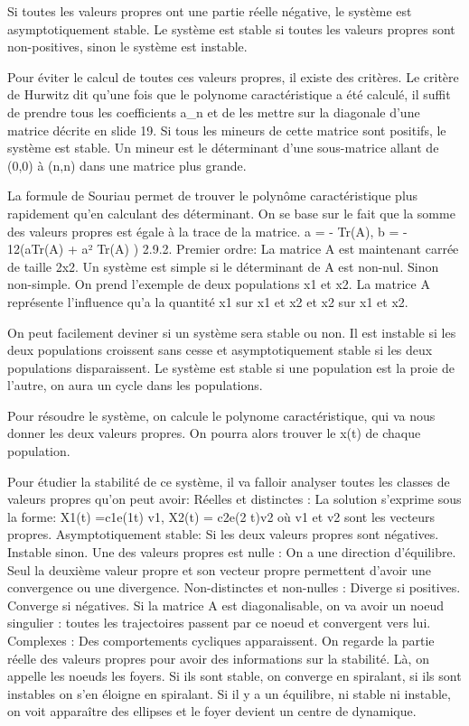 Si toutes les valeurs propres ont une partie réelle négative, le système est asymptotiquement stable.
Le système est stable si toutes les valeurs propres sont non-positives, sinon le système est instable.

Pour éviter le calcul de toutes ces valeurs propres, il existe des critères.
Le critère de Hurwitz dit qu'une fois que le polynome caractéristique a été calculé, il suffit de prendre tous les coefficients a_n et de les mettre sur la diagonale d'une matrice décrite en slide 19. Si tous les mineurs de cette matrice sont positifs, le système est stable.
Un mineur est le déterminant d’une sous-matrice allant de (0,0) à (n,n) dans une matrice plus grande.

La formule de Souriau permet de  trouver le polynôme caractéristique plus rapidement qu’en calculant des déterminant. On se base sur le fait que la somme des valeurs propres est égale à la trace de la matrice.
a = - Tr(A), b = - 12(aTr(A) + a²  Tr(A) )
2.9.2. Premier ordre:
La matrice A est maintenant carrée de taille 2x2. 
Un système est  simple si le déterminant de A est non-nul. Sinon non-simple.
 On prend l’exemple de deux populations x1 et x2. La matrice A représente l’influence qu’a la quantité x1 sur x1 et x2 et x2 sur x1 et x2.

On peut facilement deviner si un système sera stable ou non.
Il est instable si les deux populations croissent sans cesse et asymptotiquement stable si les deux populations disparaissent. Le système est stable si une population est la proie de l’autre, on aura un cycle dans les populations.

Pour résoudre le système, on calcule le polynome caractéristique, qui va nous donner les deux valeurs propres. On pourra alors trouver le x(t) de chaque population.

Pour étudier la stabilité de ce système, il va falloir analyser toutes les classes de valeurs propres qu’on peut avoir:
Réelles et distinctes : La solution s’exprime sous la forme: X1(t) =c1e(1t) v1, X2(t) = c2e(2 t)v2 où v1 et v2 sont les vecteurs propres.
Asymptotiquement stable: Si les deux valeurs propres sont négatives.
Instable sinon.
Une des valeurs propres est nulle : On a une direction d’équilibre. Seul la deuxième valeur propre et son vecteur propre permettent d’avoir une convergence ou une divergence.
Non-distinctes et non-nulles :
Diverge si positives.
Converge si négatives.
Si la matrice A est diagonalisable, on va avoir un noeud singulier : toutes les trajectoires passent par ce noeud et convergent vers lui.
Complexes : Des comportements cycliques apparaissent. On regarde la partie réelle des valeurs propres pour avoir des informations sur la stabilité. Là, on appelle les noeuds les foyers.
Si ils sont stable, on converge en spiralant, si ils sont instables on s’en éloigne en spiralant.
Si il y a un équilibre, ni stable ni instable, on voit apparaître des ellipses et le foyer devient un centre de dynamique.

